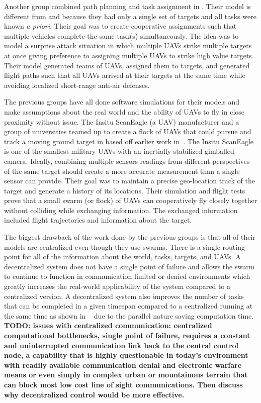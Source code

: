 Another group combined path planning and task assignment in \cite{beard}.  Their model is different from \cite{jin} and \cite{bellingham} because they had only a single set of targets and all tasks were known \textit{a priori}.  Their goal was to create cooperative assignments such that multiple vehicles complete the same task(s) simultaneously.  The idea was to model a surprise attack situation in which multiple UAVs strike multiple targets at once giving preference to assigning multiple UAVs to strike high value targets.  Their model generated teams of UAVs, assigned them to targets, and generated flight paths such that all UAVs arrived at their targets at the same time while avoiding localized short-range anti-air defenses.

The previous groups have all done software simulations for their models and make assumptions about the real world and the ability of UAVs to fly in close proximity without issue.  The Insitu ScanEagle (a UAV) manufacturer and a group of universities teamed up to create a flock of UAVs that could pursue and track a moving ground target in \cite{wheeler} based off earlier work in~\cite{wise_rolf}.  The Insitu ScanEagle is one of the smallest military UAVs with an inertially stabilized gimballed camera.  Ideally, combining multiple sensors readings from different perspectives of the same target should create a more accurate measurement than a single sensor can provide.  Their goal was to maintain a precise geo-location track of the target and generate a history of its locations.  Their simulation and flight tests prove that a small swarm (or flock) of UAVs can cooperatively fly closely together without colliding while exchanging information.  The exchanged information included flight trajectories and information about the target. 


The biggest drawback of the work done by the previous groups is that all of their models are centralized even though they use swarms.  There is a single routing point for all of the information about the world, tasks, targets, and UAVs.  A decentralized system does not have a single point of failure and allows the swarm to continue to function in communication limited or denied environments which greatly increases the real-world applicability of the system compared to a centralized version.  A decentralized system also improves the number of tasks that can be completed in a given timespan compared to a centralized running at the same time as shown in ~\cite{chien} due to the parallel nature saving computation time.  \textbf{TODO: issues with centralized communication: centralized computational bottlenecks, single point of failure, requires a constant and uninterrupted communication link back to the central control node, a capability that is highly questionable in today’s environment with readily available communication denial and electronic warfare means or even simply in complex urban or mountainous terrain that can block most low cost  line of sight communications.  Then discuss why decentralized control would be more effective.}

